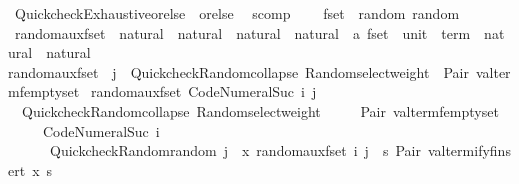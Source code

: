 \begin{isabellebody}
%
\endisatagproof
{\isafoldproof}%
%
\isadelimproof
%
\endisadelimproof
\isanewline
\isanewline
{}\isamarkupfalse%
\isanewline
\isanewline
{}\isamarkupfalse%
\ Quickcheck{\isacharunderscore}Exhaustive{\isachardot}orelse\ {\isacharparenleft}\ {\isachardoublequoteopen}orelse{\isachardoublequoteclose}\ {}{}{\isacharparenright}\isanewline
\isanewline
{}\isamarkupfalse%
\ scomp\ {\isacharparenleft}\ {\isachardoublequoteopen}{\isasymcirc}{\isasymrightarrow}{\isachardoublequoteclose}\ {}{}{\isacharparenright}\isanewline
\isanewline
{}\isamarkupfalse%
\ fset\ {\isacharcolon}{\isacharcolon}\ {\isacharparenleft}random{\isacharparenright}\ random\isanewline
{}\isanewline
\isanewline
{}\isamarkupfalse%
\ random{\isacharunderscore}aux{\isacharunderscore}fset\ {\isacharcolon}{\isacharcolon}\ {\isachardoublequoteopen}natural\ {\isasymRightarrow}\ natural\ {\isasymRightarrow}\ natural\ {\isasymtimes}\ natural\ {\isasymRightarrow}\ {\isacharparenleft}{\isacharprime}a\ fset\ {\isasymtimes}\ {\isacharparenleft}unit\ {\isasymRightarrow}\ term{\isacharparenright}{\isacharparenright}\ {\isasymtimes}\ natural\ {\isasymtimes}\ natural{\isachardoublequoteclose}\ \isanewline
{\isachardoublequoteopen}random{\isacharunderscore}aux{\isacharunderscore}fset\ {}\ j\ {\isacharequal}\ Quickcheck{\isacharunderscore}Random{\isachardot}collapse\ {\isacharparenleft}Random{\isachardot}select{\isacharunderscore}weight\ {\isacharbrackleft}{\isacharparenleft}{}{\isacharcomma}\ Pair\ valterm{\isacharunderscore}femptyset{\isacharparenright}{\isacharbrackright}{\isacharparenright}{\isachardoublequoteclose}\ {\isacharbar}\isanewline
{\isachardoublequoteopen}random{\isacharunderscore}aux{\isacharunderscore}fset\ {\isacharparenleft}Code{\isacharunderscore}Numeral{\isachardot}Suc\ i{\isacharparenright}\ j\ {\isacharequal}\isanewline
\ \ Quickcheck{\isacharunderscore}Random{\isachardot}collapse\ {\isacharparenleft}Random{\isachardot}select{\isacharunderscore}weight\isanewline
\ \ \ \ {\isacharbrackleft}{\isacharparenleft}{}{\isacharcomma}\ Pair\ valterm{\isacharunderscore}femptyset{\isacharparenright}{\isacharcomma}\isanewline
\ \ \ \ \ {\isacharparenleft}Code{\isacharunderscore}Numeral{\isachardot}Suc\ i{\isacharcomma}\isanewline
\ \ \ \ \ \ Quickcheck{\isacharunderscore}Random{\isachardot}random\ j\ {\isasymcirc}{\isasymrightarrow}\ {\isacharparenleft}{\isasymlambda}x{\isachardot}\ random{\isacharunderscore}aux{\isacharunderscore}fset\ i\ j\ {\isasymcirc}{\isasymrightarrow}\ {\isacharparenleft}{\isasymlambda}s{\isachardot}\ Pair\ {\isacharparenleft}valtermify{\isacharunderscore}finsert\ x\ s{\isacharparenright}{\isacharparenright}{\isacharparenright}{\isacharparenright}{\isacharbrackright}{\isacharparenright}{\isachardoublequoteclose}\isanewline

\end{isabellebody}
